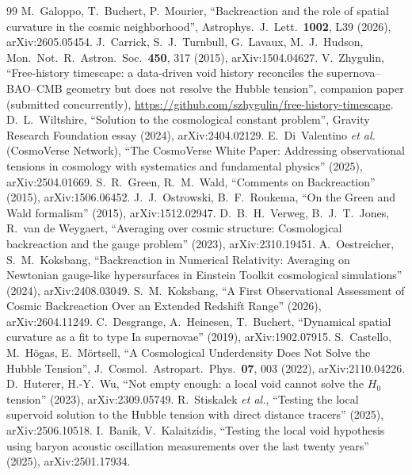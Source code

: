 \documentclass[aps,prd,twocolumn,nofootinbib,superscriptaddress,floatfix]{revtex4-2}
\begin{document}
\begin{thebibliography}{99}
 M.~Galoppo, T.~Buchert, P.~Mourier, ``Backreaction and the role of spatial curvature in the cosmic neighborhood'', Astrophys.\ J.\ Lett.\ \textbf{1002}, L39 (2026), arXiv:2605.05454.
 J.~Carrick, S.~J.~Turnbull, G.~Lavaux, M.~J.~Hudson, Mon.\ Not.\ R.\ Astron.\ Soc.\ \textbf{450}, 317 (2015), arXiv:1504.04627.
 V.~Zhygulin, ``Free-history timescape: a data-driven void history reconciles the supernova--BAO--CMB geometry but does not resolve the Hubble tension'', companion paper (submitted concurrently), \url{https://github.com/szhygulin/free-history-timescape}.
 D.~L.~Wiltshire, ``Solution to the cosmological constant problem'', Gravity Research Foundation essay (2024), arXiv:2404.02129.
 E.~Di~Valentino \emph{et al.} (CosmoVerse Network), ``The CosmoVerse White Paper: Addressing observational tensions in cosmology with systematics and fundamental physics'' (2025), arXiv:2504.01669.
 S.~R.~Green, R.~M.~Wald, ``Comments on Backreaction'' (2015), arXiv:1506.06452.
 J.~J.~Ostrowski, B.~F.~Roukema, ``On the Green and Wald formalism'' (2015), arXiv:1512.02947.
 D.~B.~H.~Verweg, B.~J.~T.~Jones, R.~van de Weygaert, ``Averaging over cosmic structure: Cosmological backreaction and the gauge problem'' (2023), arXiv:2310.19451.
 A.~Oestreicher, S.~M.~Koksbang, ``Backreaction in Numerical Relativity: Averaging on Newtonian gauge-like hypersurfaces in Einstein Toolkit cosmological simulations'' (2024), arXiv:2408.03049.
 S.~M.~Koksbang, ``A First Observational Assessment of Cosmic Backreaction Over an Extended Redshift Range'' (2026), arXiv:2604.11249.
 C.~Desgrange, A.~Heinesen, T.~Buchert, ``Dynamical spatial curvature as a fit to type Ia supernovae'' (2019), arXiv:1902.07915.
 S.~Castello, M.~H\"ogas, E.~M\"ortsell, ``A Cosmological Underdensity Does Not Solve the Hubble Tension'', J.\ Cosmol.\ Astropart.\ Phys.\ \textbf{07}, 003 (2022), arXiv:2110.04226.
 D.~Huterer, H.-Y.~Wu, ``Not empty enough: a local void cannot solve the $H_0$ tension'' (2023), arXiv:2309.05749.
 R.~Stiskalek \emph{et al.}, ``Testing the local supervoid solution to the Hubble tension with direct distance tracers'' (2025), arXiv:2506.10518.
 I.~Banik, V.~Kalaitzidis, ``Testing the local void hypothesis using baryon acoustic oscillation measurements over the last twenty years'' (2025), arXiv:2501.17934.

\end{thebibliography}
\end{document}
